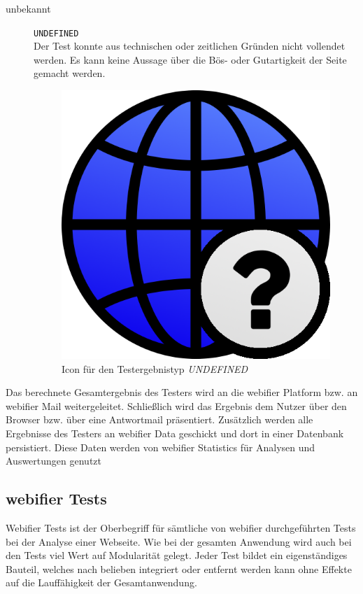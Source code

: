 \begin{description}
	\item[unbekannt] \hfill \texttt{UNDEFINED} \\
	Der Test konnte aus technischen oder zeitlichen Gründen nicht vollendet werden.
	Es kann keine Aussage über die Bös- oder Gutartigkeit der Seite gemacht werden.
	\begin{figure}[H]
		\centering
		\includegraphics[scale=0.2]{images/webifier-undefined}
		\caption{Icon für den Testergebnistyp \textit{UNDEFINED}}
	\end{figure}
\end{description} 

Das berechnete Gesamtergebnis des Testers wird an die webifier Platform bzw. an webifier
Mail weitergeleitet. Schließlich wird das Ergebnis dem Nutzer über den Browser bzw. über eine
Antwortmail präsentiert. Zusätzlich werden alle Ergebnisse des Testers an webifier Data geschickt
und dort in einer Datenbank persistiert. Diese Daten werden von webifier Statistics für Analysen und
Auswertungen genutzt

\subsection{webifier Tests}
Webifier Tests ist der Oberbegriff für sämtliche von webifier durchgeführten Tests bei der Analyse einer Webseite. Wie bei der gesamten Anwendung wird auch bei den Tests viel Wert auf Modularität gelegt. Jeder Test bildet ein eigenständiges Bauteil, welches nach belieben integriert oder entfernt werden kann ohne Effekte auf die Lauffähigkeit der Gesamtanwendung.

